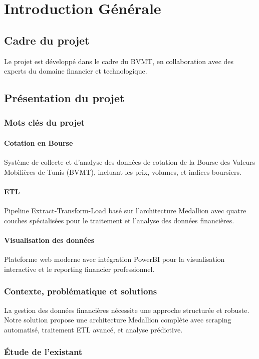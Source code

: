 \section{Introduction Générale}

\subsection{Cadre du projet}
Le projet est développé dans le cadre du BVMT, en collaboration avec des experts du domaine financier et technologique.

\subsection{Présentation du projet}
\subsubsection{Mots clés du projet}
\paragraph{Cotation en Bourse}
Système de collecte et d'analyse des données de cotation de la Bourse des Valeurs Mobilières de Tunis (BVMT), incluant les prix, volumes, et indices boursiers.

\paragraph{ETL}
Pipeline Extract-Transform-Load basé sur l'architecture Medallion avec quatre couches spécialisées pour le traitement et l'analyse des données financières.

\paragraph{Visualisation des données}
Plateforme web moderne avec intégration PowerBI pour la visualisation interactive et le reporting financier professionnel.

\subsubsection{Contexte, problématique et solutions}
La gestion des données financières nécessite une approche structurée et robuste. Notre solution propose une architecture Medallion complète avec scraping automatisé, traitement ETL avancé, et analyse prédictive.

\subsubsection{Étude de l'existant}
